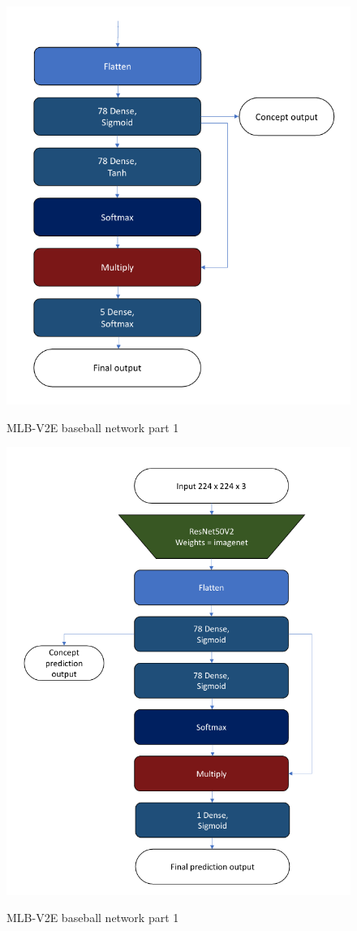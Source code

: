 \begin{figure}[h]
\caption{MLB-V2E baseball network part 1}
\vspace{10pt}
\centering
\includegraphics[width=\textwidth]{appendix/mlb network part 2.png}
\label{mlb-network-2}
\end{figure}

\begin{figure}[h]
\caption{MLB-V2E baseball network part 1}
\vspace{10pt}
\centering
\includegraphics[width=\textwidth]{appendix/birds flowers prediction network.png}
\label{birds-flowers-network}
\end{figure}

